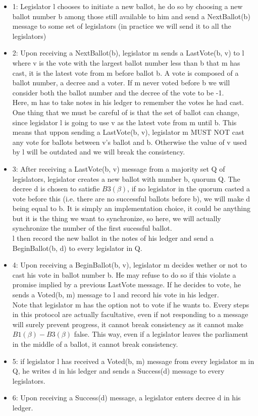 \documentclass{article}
\begin{document}
\begin{itemize}
    \item 1: Legislator l chooses to initiate a new ballot, he do so by choosing a new ballot number b among those still available to him and send a NextBallot(b) message to some set of legislators (in practice we will send it to all the legislators)
    \item 2: Upon receiving a NextBallot(b), legislator m sends a LastVote(b, v) to l where v is the vote with the largest ballot number less than b that m has cast, it is the latest vote from m before ballot b. A vote is composed of a ballot number, a decree and a voter. If m never voted before b we will consider both the ballot number and the decree of the vote to be -1.\\
        Here, m has to take notes in his ledger to remember the votes he had cast.
        One thing that we must be careful of is that the set of ballot can change, since legislator l is going to use v as the latest vote from m until b. This means that uppon sending a LastVote(b, v), legislator m MUST NOT cast any vote for ballots between v's ballot and b. Otherwise the value of v used by l will be outdated and we will break the consistency.
    \item 3: After receiving a LastVote(b, v) message from a majority set Q of legislators, legislator creates a new ballot with number b, quorum Q. The decree d is chosen to satisfie $B3(\beta)$, if no legislator in the quorum casted a vote before this (i.e. there are no successful ballots before b), we will make d being equal to b. It is simply an implementation choice, it could be anything but it is the thing we want to synchronize, so here, we will actually synchronize the number of the first sucessful ballot.\\
        l then record the new ballot in the notes of his ledger and send a BeginBallot(b, d) to every legislator in Q.
    \item 4: Upon receiving a BeginBallot(b, v), legislator m decides wether or not to cast his vote in ballot number b. He may refuse to do so if this violate a promise implied by a previous LastVote message. If he decides to vote, he sends a Voted(b, m) message to l and record his vote in his ledger.\\
        Note that legislator m has the option not to vote if he wants to. Every steps in this protocol are actually facultative, even if not responding to a message will surely prevent progress, it cannot break consistency as it cannot make $B1(\beta)-B3(\beta)$ false. This way, even if a legislator leaves the parliament in the middle of a ballot, it cannot break consistency.
    \item 5: if legislator l has received a Voted(b, m) message from every legislator m in Q, he writes d in his ledger and sends a Success(d) message to every legislators.
    \item 6: Upon receiving a Success(d) message, a legislator enters decree d in his ledger.
\end{itemize}
\end{document}
